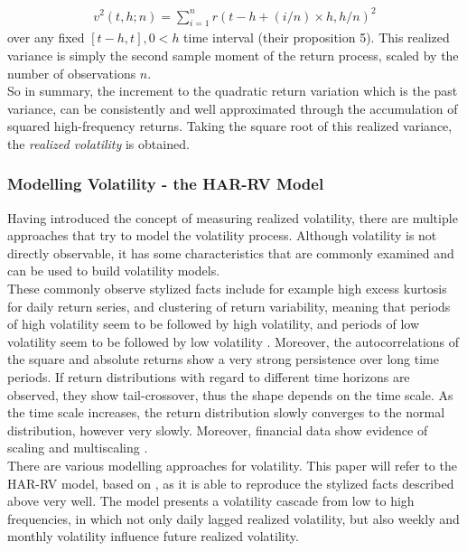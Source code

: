 \begin{align}\label{eq:RV-andersen}
v^2(t,h;n) = \sum_{i=1}^{n} r(t-h+(i/n) \times h,h/n)^2
\end{align}
over any fixed $[t-h,t], 0 < h$ time interval (their proposition 5). This realized variance is simply the second sample moment of the return process, scaled by the number of observations $n$.\\
So in summary, the increment to the quadratic return variation which is the past variance, can be consistently and well approximated through the accumulation of squared high-frequency returns. Taking the square root of this realized variance, the \emph{realized volatility} is obtained.


\subsubsection{Modelling Volatility - the HAR-RV Model}\label{sec:222HAR-RV}
Having introduced the concept of measuring realized volatility, there are multiple approaches that try to model the volatility process. Although volatility is not directly observable, it has some characteristics that are commonly examined and can be used to build volatility models. \\
These commonly observe stylized facts include for example high excess kurtosis for daily return series, and clustering of return variability, meaning that periods of high volatility seem to be followed by high volatility, and periods of low volatility seem to be followed by low volatility \parencite{tsay2005}. Moreover, the autocorrelations of the square and absolute returns show a very strong persistence over long time periods. If return distributions with regard to different time horizons are observed, they show tail-crossover, thus the shape depends on the time scale. As the time scale increases, the return distribution slowly converges to the normal distribution, however very slowly. Moreover, financial data show evidence of scaling and multiscaling \parencite{corsi2009}. \\
There are various modelling approaches for volatility. This paper will refer to the HAR-RV model, based on \textcite{corsi2009}, as it is able to reproduce the stylized facts described above very well. The model presents a volatility cascade from low to high frequencies, in which not only daily lagged realized volatility, but also weekly and monthly volatility influence future realized volatility.\\
